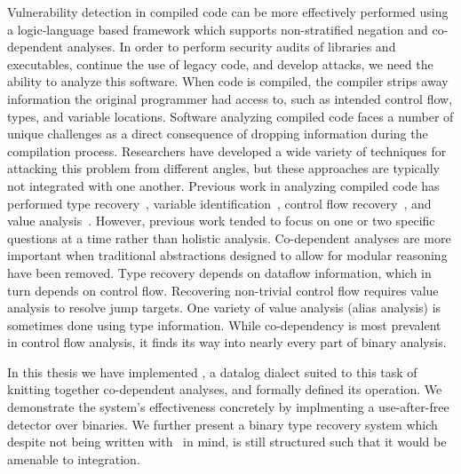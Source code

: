 Vulnerability detection in compiled code can be more effectively performed using a logic-language based framework which supports non-stratified negation and co-dependent analyses.
In order to perform security audits of libraries and executables, continue the use of legacy code, and develop attacks, we need the ability to analyze this software.
When code is compiled, the compiler strips away information the original programmer had access to, such as intended control flow, types, and variable locations.
Software analyzing compiled code faces a number of unique challenges as a direct consequence of dropping information during the compilation process.
Researchers have developed a wide variety of techniques for attacking this problem from different angles, but these approaches are typically not integrated with one another.
Previous work in analyzing compiled code has performed type recovery~\cite{bitr}, variable identification~\cite{divine}, control flow recovery~\cite{jakstab,phoenix}, and value analysis~\cite{vsa}.
However, previous work tended to focus on one or two specific questions at a time rather than holistic analysis.
Co-dependent analyses are more important when traditional abstractions designed to allow for modular reasoning have been removed.
Type recovery depends on dataflow information\cite{bitr,tie,sndwrite}, which in turn depends on control flow.
Recovering non-trivial control flow requires value analysis to resolve jump targets.
One variety of value analysis (alias analysis) is sometimes done using type information.
While co-dependency is most prevalent in control flow analysis, it finds its way into nearly every part of binary analysis.

In this thesis we have implemented \sysname, a datalog dialect suited to this task of knitting together co-dependent analyses, and formally defined its operation.
We demonstrate the system's effectiveness concretely by implmenting a use-after-free detector over binaries.
We further present a binary type recovery system which despite not being written with \sysname\ in mind, is still structured such that it would be amenable to integration.
